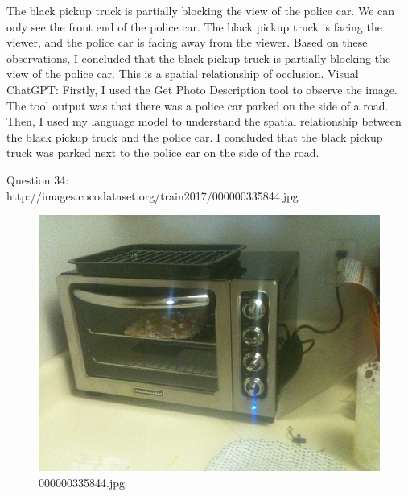 \begin{enumerate}
        The black pickup truck is partially blocking the view of the police car.
        We can only see the front end of the police car.
        The black pickup truck is facing the viewer, and the police car is facing away from the viewer.
        Based on these observations, I concluded that the black pickup truck is partially blocking the view of the police car. This is a spatial relationship of occlusion.
        \subitem Visual ChatGPT: Firstly, I used the Get Photo Description tool to observe the image. The tool output was that there was a police car parked on the side of a road. Then, I used my language model to understand the spatial relationship between the black pickup truck and the police car. I concluded that the black pickup truck was parked next to the police car on the side of the road.
    \end{enumerate}
    Question 34:\\http://images.cocodataset.org/train2017/000000335844.jpg
    \begin{figure}[h]
        \centering
        \includegraphics[width=0.8\linewidth]{../image set/easy/000000335844.jpg}
        \caption{000000335844.jpg}
    \end{figure}
